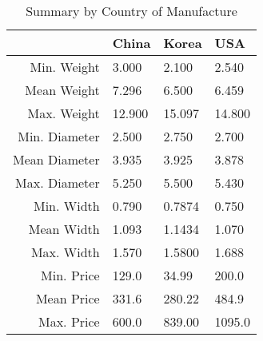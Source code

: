 \begin{table}[ht]
\centering
\begin{tabular}{rlll}
  \hline
 & China & Korea & USA \\ 
  \hline
Min. Weight &  3.000 &  2.100 &  2.540 \\ 
  Mean Weight &  7.296 &  6.500 &  6.459 \\ 
  Max. Weight & 12.900 & 15.097 & 14.800 \\ 
  Min. Diameter & 2.500 & 2.750 & 2.700 \\ 
  Mean Diameter & 3.935 & 3.925 & 3.878 \\ 
  Max. Diameter & 5.250 & 5.500 & 5.430 \\ 
  Min. Width & 0.790 & 0.7874 & 0.750 \\ 
  Mean Width & 1.093 & 1.1434 & 1.070 \\ 
  Max. Width & 1.570 & 1.5800 & 1.688 \\ 
  Min. Price & 129.0 &  34.99 &  200.0 \\ 
  Mean Price & 331.6 & 280.22 &  484.9 \\ 
  Max. Price & 600.0 & 839.00 & 1095.0 \\ 
   \hline
\end{tabular}
\caption{Summary by Country of Manufacture} 
\label{tab:summ_by_country}
\end{table}
